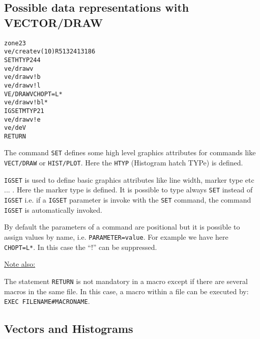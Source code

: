 \subsection{Possible data representations with VECTOR/DRAW}
\begin{alltt}
      zone 2 3
      ve/create v(10) R 5 1 3 2 4 1 3 1 8 6
     SET HTYP 244
      ve/draw v
      ve/draw v ! b
      ve/draw v ! l
     VE/DRAW V CHOPT=L*
      ve/draw v ! bl*
     IGSET MTYP 21
      ve/draw v ! e
      ve/de V
     RETURN
\end{alltt} 
\begin{DinglistE}
\item The command {\tt SET} defines some high level
      graphics attributes for commands like {\tt VECT/DRAW} or {\tt HIST/PLOT}.
      Here the {\tt HTYP} (Histogram hatch TYPe) is defined.
       
\item {\tt IGSET} is used to define basic graphics
      attributes like line width, marker type etc ... . Here the marker
      type is defined. It is possible to type always {\tt SET} instead 
      of {\tt IGSET} i.e. if a {\tt IGSET} parameter is invoke with the
      {\tt SET} command, the command {\tt IGSET} is automatically invoked.
\item By default the parameters of a command are positional but it is
      possible to assign values by name, i.e. {\tt PARAMETER=value}. For
      example we have here {\tt CHOPT=L*}. In this case the ``!'' can be
      suppressed.

\underline{Note also:}

\item The statement {\tt RETURN} is not mandatory in a macro except if there
      are several macros in the same file. In this case, a macro within a
      file can be executed by: {\tt EXEC FILENAME\#MACRONAME}.
\end{DinglistE}

\clearpage

\subsection{Vectors and Histograms}
\label{sec:vectordrawplot}
